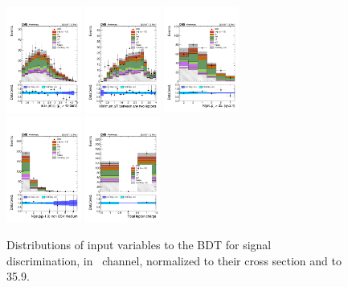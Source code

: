 \begin{figure} [!h]
  \includegraphics[width=0.22\textwidth]{figures/signalregion_2lss/mumu/maxEtaJet25_40.pdf}
  \includegraphics[width=0.22\textwidth]{figures/signalregion_2lss/mumu/minDRll.pdf} 
  \includegraphics[width=0.22\textwidth]{figures/signalregion_2lss/mumu/nJet25.pdf} \\
  \includegraphics[width=0.22\textwidth]{figures/signalregion_2lss/mumu/nJetEta1_40.pdf}
  \includegraphics[width=0.22\textwidth]{figures/signalregion_2lss/mumu/totCharge.pdf}
\caption{Distributions of input variables to the BDT for signal discrimination, in \mumu\ channel, normalized to their cross section and to 35.9\fbinv.}
\label{fig:input_vars_2lss_xsec_mumu}
\end{figure}

